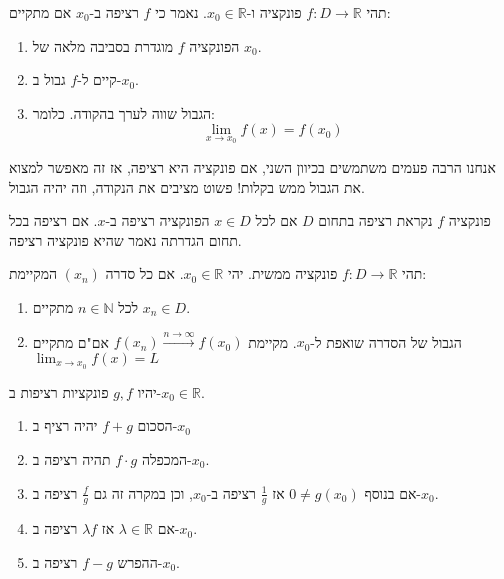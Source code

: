 \documentclass{tstextbook}
\begin{document}
\begin{definition}
תהי \(f:D\to \mathbb{R}\) פונקציה ו-\(x_{0} \in \mathbb{R}\). נאמר כי \(f\) רציפה ב-\(x_{0}\) אם מתקיים:

  \begin{enumerate}
    \item הפונקציה \(f\) מוגדרת בסביבה מלאה של \(x_{0}\). 


    \item קיים ל-\(f\) גבול ב-\(x_{0}\). 


    \item הגבול שווה לערך בהקודה. כלומר: 
$$\lim_{ x \to x_{0} } f(x)=f(x_{0})$$


  \end{enumerate}
\end{definition}
\begin{remark}
אנחנו הרבה פעמים משתמשים בכיוון השני, אם פונקציה היא רציפה, אז זה מאפשר למצוא את הגבול ממש בקלות! פשוט מציבים את הנקודה, וזה יהיה הגבול.

\end{remark}
\begin{definition}
פונקציה \(f\) נקראת רציפה בתחום \(D\) אם לכל \(x \in D\) הפונקציה רציפה ב-\(x\). אם רציפה בכל תחום הגדרתה נאמר שהיא פונקציה רציפה.

\end{definition}
\begin{proposition}
תהי \(f:D\to \mathbb{R}\) פונקציה ממשית. יהי \(x_{0} \in \mathbb{R}\). אם כל סדרה \((x_{n})\) המקיימת:

  \begin{enumerate}
    \item לכל \(n \in \mathbb{N}\) מתקיים \(x_{n}\in D\). 


    \item הגבול של הסדרה שואפת ל-\(x_{0}\). 
מקיימת \(f(x_{n})\xrightarrow{n\to \infty}f(x_{0})\) אם"ם מתקיים \(\lim_{ x \to x_{0} }f(x)=L\)


  \end{enumerate}
\end{proposition}
\begin{theorem}
יהיו \(g,f\) פונקציות רציפות ב-\(x_{0} \in \mathbb{R}\). 

  \begin{enumerate}
    \item הסכום \(f+g\) יהיה רציף ב-\(x_{0}\)


    \item המכפלה \(f\cdot g\) תהיה רציפה ב-\(x_{0}\). 


    \item אם בנוסף \(0\neq g(x_{0})\) אז \(\frac{1}{g}\) רציפה ב-\(x_{0}\), וכן במקרה זה גם \(\frac{f}{g}\) רציפה ב-\(x_{0}\). 


    \item אם \(\lambda \in \mathbb{R}\) אז \(\lambda f\) רציפה ב-\(x_{0}\). 


    \item ההפרש \(f-g\) רציפה ב-\(x_{0}\). 


  \end{enumerate}
\end{theorem}
\end{document}
